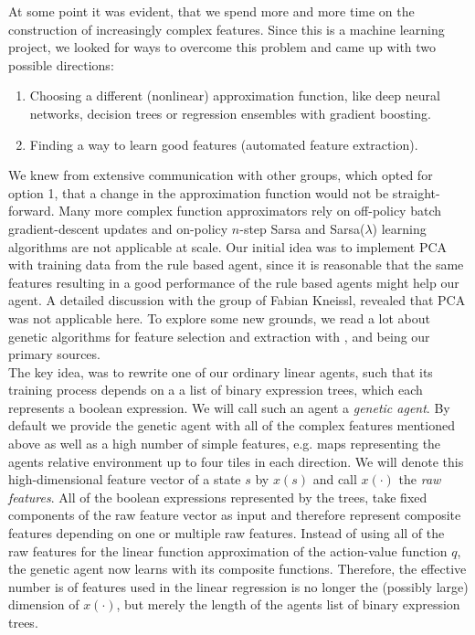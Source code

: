 At some point it was evident, that we spend more and more time on the construction of increasingly complex features. Since this is a machine learning project, we looked for ways to overcome this problem and came up with two possible directions:
\begin{enumerate}
	\item Choosing a different (nonlinear) approximation function, like deep neural networks, decision trees or regression ensembles with gradient boosting.
	\item Finding a way to learn good features (automated feature extraction).
\end{enumerate}
 
We knew from extensive communication with other groups, which opted for option 1, that a change in the approximation function would not be straight-forward. Many more complex function approximators rely on off-policy batch gradient-descent updates and on-policy $n$-step Sarsa and Sarsa($\lambda$) learning algorithms are not applicable at scale. Our initial idea was to implement PCA with training data from the rule based agent, since it is reasonable that the same features resulting in a good performance of the rule based agents might help our agent. A detailed discussion with the group of Fabian Kneissl, revealed that PCA was not applicable here. To explore some new grounds, we read a lot about genetic algorithms for feature selection and extraction with \cite{cha2008}, \cite{nguyen2011} and \cite{li2005} being our primary sources. \\

The key idea, was to rewrite one of our ordinary linear agents, such that its training process depends on a a list of binary expression trees, which each represents a boolean expression. We will call such an agent a \emph{genetic agent}. By default we provide the genetic agent with all of the complex features mentioned above as well as a high number of simple features, e.g. maps representing the agents relative environment up to four tiles in each direction. We will denote this high-dimensional feature vector of a state $s$ by $x(s)$ and call $x(\cdot)$ the \emph{raw features}. All of the boolean expressions represented by the trees, take fixed components of the raw feature vector as input and therefore represent composite features depending on one or multiple raw features. Instead of using all of the raw features for the linear function approximation of the action-value function $q$, the genetic agent now learns with its composite functions. Therefore, the effective number is of features used in the linear regression is no longer the (possibly large) dimension of $x(\cdot)$, but merely the length of the agents list of binary expression trees. \\

